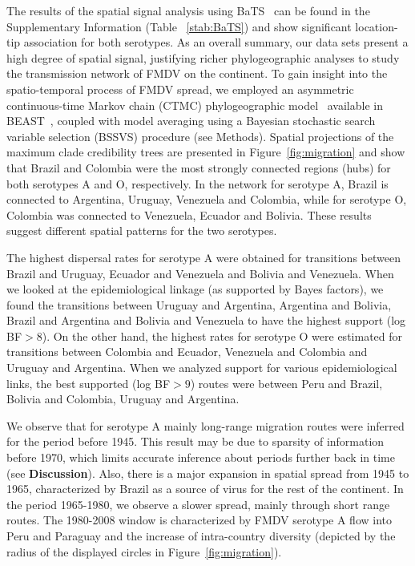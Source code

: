 \documentclass[10pt]{article}
\begin{document}
The results of the spatial signal analysis using BaTS~\cite{bats} can be found in the Supplementary Information (Table ~\ref{stab:BaTS}) and show significant location-tip association for both serotypes.
As an overall summary, our data sets present a high degree of spatial signal, justifying richer phylogeographic analyses to study the transmission network of FMDV on the continent.
To gain insight into the spatio-temporal process of FMDV spread, we employed an asymmetric continuous-time Markov chain (CTMC) phylogeographic model~\cite{roots} available in BEAST~\cite{beast2012}, coupled  with model averaging using a Bayesian stochastic search variable selection (BSSVS) procedure (see Methods).
Spatial projections of the maximum clade credibility trees are presented in Figure~\ref{fig:migration} and show that Brazil and Colombia were the most strongly connected regions (hubs) for both serotypes A and O, respectively. 
In the network for serotype A, Brazil is connected to Argentina, Uruguay, Venezuela and Colombia, while for serotype O, Colombia was connected to Venezuela, Ecuador and Bolivia.
These results suggest different spatial patterns for the two serotypes.

The highest dispersal rates for serotype A were obtained for transitions between Brazil and Uruguay, Ecuador and Venezuela and Bolivia and Venezuela.
When we looked at the epidemiological linkage (as supported by Bayes factors), we found the transitions between Uruguay and Argentina, Argentina and Bolivia, Brazil and Argentina and Bolivia and Venezuela to have the highest support (log BF$>8$).
On the other hand, the highest rates for serotype O were estimated for transitions between Colombia and Ecuador, Venezuela and Colombia and Uruguay and Argentina.
When we analyzed support for various epidemiological links, the best supported (log BF$>9$) routes were between Peru and Brazil, Bolivia and Colombia, Uruguay and Argentina.

We observe that for serotype A mainly long-range migration routes were inferred for the period before 1945.
This result may be due to sparsity of information before 1970, which limits accurate inference about periods further back in time (see {\bf Discussion}). 
Also, there is a major expansion in spatial spread from 1945 to 1965, characterized by Brazil as a source of virus for the rest of the continent.
In the period 1965-1980, we observe a slower spread, mainly through short range routes.
The 1980-2008 window is characterized by FMDV serotype A flow into Peru and Paraguay and the increase of intra-country diversity (depicted by the radius of the displayed circles in Figure~\ref{fig:migration}).   
\end{document}
